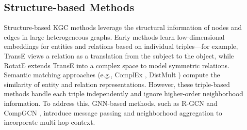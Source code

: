 \documentclass[11pt]{article}
\begin{document}
\subsection{Structure-based Methods}


Structure-based KGC methods leverage the structural information of nodes and edges in large heterogeneous graphs. Early methods learn low-dimensional embeddings for entities and relations based on individual triples—for example, TransE \citep{bordes2013translating} views a relation as a translation from the subject to the object, while RotatE \citep{sun2019rotate} extends TransE into a complex space to model symmetric relations. Semantic matching approaches (e.g., ComplEx \citep{trouillon2016complex}, DistMult \citep{yang2014embedding}) compute the similarity of entity and relation representations. However, these triple-based methods handle each triple independently and ignore higher-order neighborhood information. To address this, GNN-based methods, such as R-GCN \citep{schlichtkrull2018modeling} and CompGCN \citep{vashishth2019composition-based}, introduce message passing and neighborhood aggregation to incorporate multi-hop context.
\end{document}
